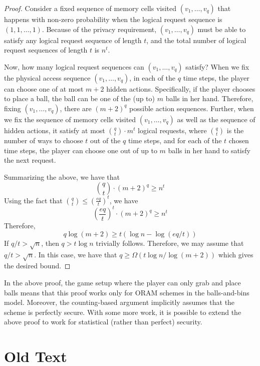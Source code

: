 \begin{proof}
Consider a fixed sequence of memory cells visited 
$(v_1, \ldots, v_q)$ 
that happens with non-zero probability 
when the logical request sequence is $(1, 1, \ldots, 1)$.
Because of the privacy requirement, 
$(v_1, \ldots, v_q)$ 
must be able to satisfy any logical request
sequence of length $t$, and the total number
of logical request sequences of length $t$ is $n^t$.

Now, how many logical request sequences
can $(v_1, \ldots, v_q)$ 
satisfy? 
When we fix %
the physical access sequence 
$(v_1, \ldots, v_q)$, 
in each of the 
$q$ time steps, the player can choose 
one of at most $m+2$ hidden actions. 
Specifically, if the player chooses to place a ball,
the ball can be 
one of the (up to) $m$ balls in her hand. 
Therefore, fixing $(v_1, \ldots, v_q)$, there are 
$(m+2)^q$ possible 
action sequences.
Further, when we fix the sequence of memory cells
visited $(v_1, \ldots, v_q)$
as well as the sequence of hidden actions, 
it 
satisfy at most ${q \choose t} \cdot m^t$
logical requests, where $q \choose t$ is the number
of ways to choose $t$ out of the $q$ time steps,
and for each of the $t$ chosen time steps, the player can choose
one out of up to $m$ balls in her hand to satisfy the next request.

Summarizing the above, we have
that 
\[
{q \choose t} \cdot (m+2)^q \geq n^t
\]
Using the fact that ${q \choose t} \leq \left(\frac{eq}{t}\right)^t$, we have
\[
\left(\frac{eq}{t}\right)^t\cdot (m+2)^q \geq n^t
\]
Therefore,
\[
q \log(m+2) \geq t (\log n  -  \log (eq/t))
\]
If $q/t > \sqrt{n}$, then $q > t \log n$ trivially follows.
Therefore, we may assume that $q/t > \sqrt{n}$.  
In this case, 
we have that 
$q \geq \Omega(t\log n/\log(m+2))$ which gives the desired bound. 
\end{proof}

In the above proof, 
the game setup
where the player can only grab and place
balls means that this proof works only 
for ORAM schemes in the balls-and-bins model.
Moreover,  the counting-based argument %
implicitly assumes that the 
scheme is perfectly secure.
With some more work,
it is possible to extend the above proof to 
work for statistical (rather than 
perfect) security. 

\section{Old Text}


